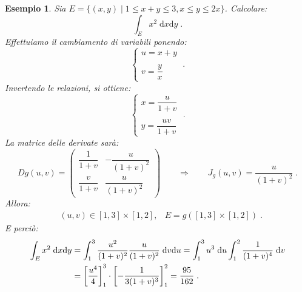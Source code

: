 \documentclass[a4paper,12pt]{report}
\theoremstyle{plain}
\newtheorem{exm}{Esempio}[section]
\theoremstyle{definition}
\theoremstyle{remark}
\newcommand{\diff}[1]{\mathrm{d}#1}
\numberwithin{equation}{section}
\begin{document}
\begin{exm} Sia $E=\{(x,y)\;|\;1\le x+y\le 3,x\le y\le 2x\}$. Calcolare:
\begin{equation}
\int_E x^2\;\diff{x}\diff{y}\;.
\end{equation}
Effettuiamo il cambiamento di variabili ponendo:
\begin{equation}
\begin{cases}
 u=x+y \\
\\
v=\dfrac{y}{x}
\end{cases}\;.
\end{equation}
Invertendo le relazioni, si ottiene:
\begin{equation}
\begin{cases}
 x=\dfrac{u}{1+v} \\
\\
y=\dfrac{uv}{1+v}
\end{cases}\;.
\end{equation}
La matrice delle derivate sarà:
\begin{equation}
Dg(u,v)=\begin{pmatrix}
               \dfrac{1}{1+v} & -\dfrac{u}{(1+v)^2} \\
\dfrac{v}{1+v} & \dfrac{u}{(1+v)^2}
              \end{pmatrix}\qquad  \Longrightarrow\qquad  J_g(u,v)=\frac{u}{(1+v)^2}\;.
\end{equation}
Allora:
\begin{align}
&(u,v)\in [1,3]\times [1,2], &E=g([1,3]\times[1,2])\;.
\end{align}
E perciò:
\begin{align}
\int_E x^2\;\diff{x}\diff{y} &=\int_1^3\frac{u^2}{(1+v)^2}\frac{u}{(1+v)^2}\;\diff{v}\diff{u}=\int_1^3u^3\;\diff{u}\int_1^2\frac{1}{(1+v)^4}\;\diff{v} \notag \\
&=\left[\frac{u^4}{4}\right]^3_1\cdot \left[-\frac{1}{3(1+v)^3}\right]^2_1=\frac{95}{162}\;.
\end{align}
\end{exm}
\end{document}
